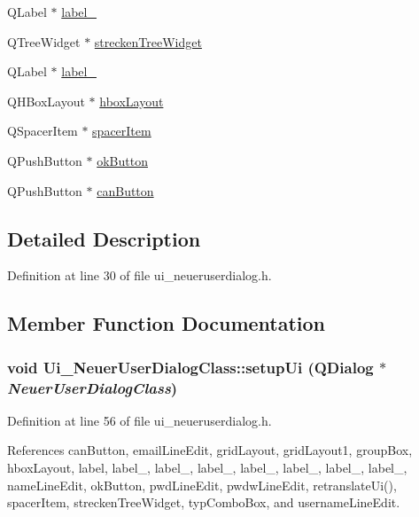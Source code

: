 \begin{CompactItemize}
QLabel $\ast$ \hyperlink{class_ui___neuer_user_dialog_class_49a04c8edaea91e0a4e76ecf69ef3ca9}{label\_}
\item 
QTreeWidget $\ast$ \hyperlink{class_ui___neuer_user_dialog_class_2bcaa4e408397905be142139e5bd794d}{streckenTreeWidget}
\item 
QLabel $\ast$ \hyperlink{class_ui___neuer_user_dialog_class_4d5cd56ce59f029b603240b7a8d64108}{label\_}
\item 
QHBoxLayout $\ast$ \hyperlink{class_ui___neuer_user_dialog_class_d6d0d8c1e35e24110e43c89e8f1b2445}{hboxLayout}
\item 
QSpacerItem $\ast$ \hyperlink{class_ui___neuer_user_dialog_class_a98d9c7863ca110cda0db7669c02ae25}{spacerItem}
\item 
QPushButton $\ast$ \hyperlink{class_ui___neuer_user_dialog_class_fc8242ec3276ed86945abe32fab065e4}{okButton}
\item 
QPushButton $\ast$ \hyperlink{class_ui___neuer_user_dialog_class_e2057c836f8bdd8a3aab3811363cfe9c}{canButton}
\end{CompactItemize}


\subsection{Detailed Description}


Definition at line 30 of file ui\_\-neueruserdialog.h.

\subsection{Member Function Documentation}
\hypertarget{class_ui___neuer_user_dialog_class_a5315d1a0ab462b8545f222ea764c6d6}{
\subsubsection[setupUi]{\setlength{\rightskip}{0pt plus 5cm}void Ui\_\-NeuerUserDialogClass::setupUi (QDialog $\ast$ {\em NeuerUserDialogClass})}}
\label{class_ui___neuer_user_dialog_class_a5315d1a0ab462b8545f222ea764c6d6}




Definition at line 56 of file ui\_\-neueruserdialog.h.

References canButton, emailLineEdit, gridLayout, gridLayout1, groupBox, hboxLayout, label, label\_, label\_, label\_, label\_, label\_, label\_, label\_, nameLineEdit, okButton, pwdLineEdit, pwdwLineEdit, retranslateUi(), spacerItem, streckenTreeWidget, typComboBox, and usernameLineEdit.

